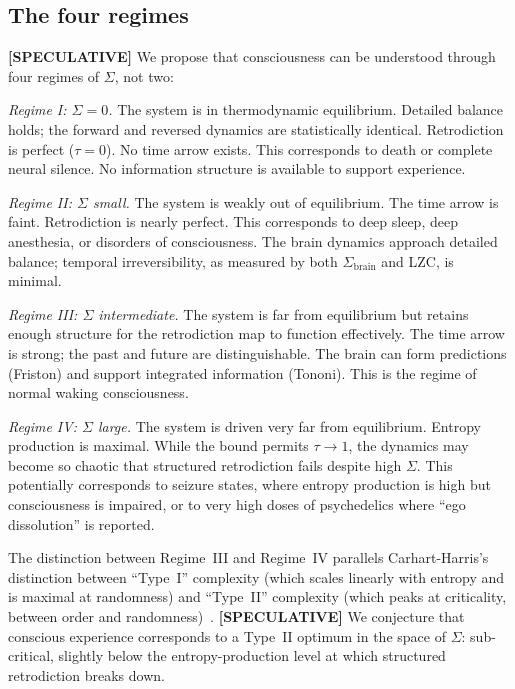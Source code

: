 \documentclass[prl,twocolumn,superscriptaddress,longbibliography,floatfix]{revtex4-2}
\newcommand{\tauasym}{\tau}
\newcommand{\Sbrain}{\Sigma_{\mathrm{brain}}}
\begin{document}
\subsection{The four regimes}
\label{subsec:regimes}

\textbf{[SPECULATIVE]}
We propose that consciousness can be understood through four regimes
of $\Sigma$, not two:

\emph{Regime I: $\Sigma = 0$.}  The system is in thermodynamic
equilibrium.  Detailed balance holds; the forward and reversed
dynamics are statistically identical.  Retrodiction is perfect
($\tauasym = 0$).  No time arrow exists.  This corresponds to death
or complete neural silence.  No information structure is available to
support experience.

\emph{Regime II: $\Sigma$ small.}  The system is weakly out of
equilibrium.  The time arrow is faint.  Retrodiction is nearly
perfect.  This corresponds to deep sleep, deep anesthesia, or
disorders of consciousness.  The brain dynamics approach detailed
balance; temporal irreversibility, as measured by both $\Sbrain$ and
LZC, is minimal.

\emph{Regime III: $\Sigma$ intermediate.}  The system is far from
equilibrium but retains enough structure for the retrodiction map
to function effectively.  The time arrow is strong; the past and
future are distinguishable.  The brain can form predictions
(Friston) and support integrated information (Tononi).  This is the
regime of normal waking consciousness.

\emph{Regime IV: $\Sigma$ large.}  The system is driven very far
from equilibrium.  Entropy production is maximal.  While the bound
permits $\tauasym \to 1$, the dynamics may become so chaotic that
structured retrodiction fails despite high $\Sigma$.  This
potentially corresponds to seizure states, where entropy production
is high but consciousness is impaired, or to very high doses of
psychedelics where ``ego dissolution'' is reported.

The distinction between Regime~III and Regime~IV parallels
Carhart-Harris's distinction between ``Type~I'' complexity (which
scales linearly with entropy and is maximal at randomness) and
``Type~II'' complexity (which peaks at criticality, between order
and randomness)~\cite{CarhartHarris2018}.  \textbf{[SPECULATIVE]}
We conjecture that conscious experience corresponds to a Type~II
optimum in the space of $\Sigma$: sub-critical, slightly below the
entropy-production level at which structured retrodiction breaks
down.
\end{document}
